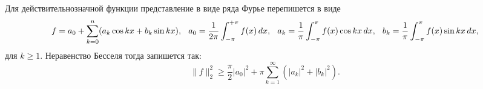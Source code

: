 \begin{to_lem}
    Для действительнозначной функции представление в виде ряда Фурье перепишется в виде
    \begin{equation*}
        f = a_0 + \sum_{k=0}^{n} (a_k \cos kx + b_k \sin kx),
        \hspace{0.25 cm}
        a_0 = \frac{1}{2\pi} \int_{-\pi}^{+\pi} f(x) \, d x,
        \hspace{2.5 mm} 
        a_k = \frac{1}{\pi}\int_{-\pi}^{\pi} f(x) \cos kx \, d x,
        \hspace{0.25 cm}
        b_k = \frac{1}{\pi} \int_{-\pi}^{\pi} f(x) \sin kx \, d x,
    \end{equation*}
    для $k \geq 1$. Неравенство Бесселя тогда запишется так:
    \begin{equation*}
        \|f\|_2^2 \geq \frac{\pi}{2} |a_0|^2 + 
        \pi \sum_{k=1}^{\infty} (|a_k|^2 + |b_k|^2).
    \end{equation*}
\end{to_lem}


